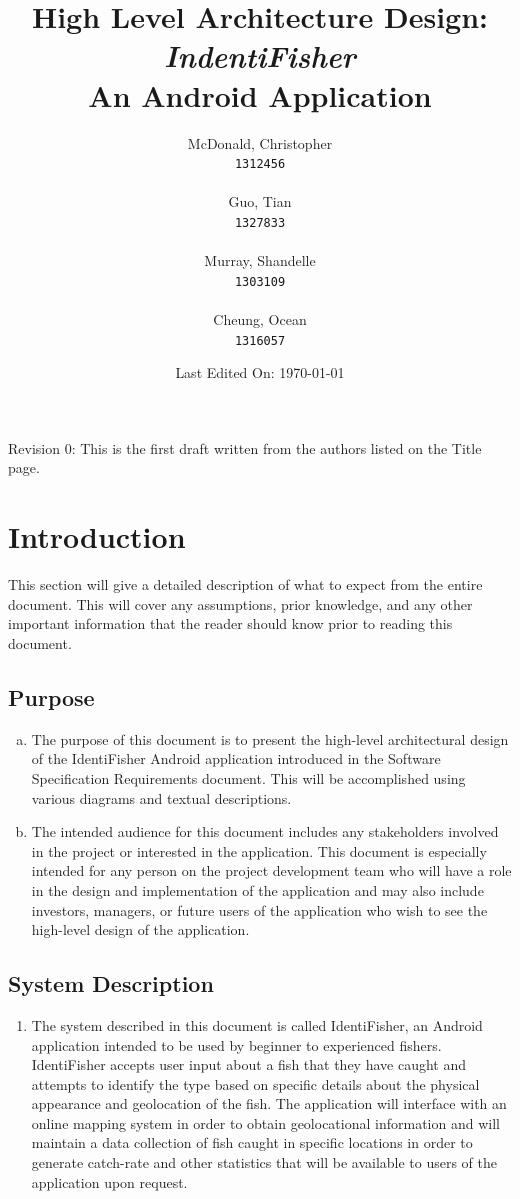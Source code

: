 \documentclass[]{article}
\title{High Level Architecture Design: \\ \textit{IndentiFisher} \\ An Android Application \\}
\author{
\Large McDonald, Christopher\\
\texttt{1312456} \\ \\
\Large Guo, Tian\\
\texttt{1327833} \\ \\
\Large Murray, Shandelle\\
\texttt{1303109} \\ \\
\Large Cheung, Ocean\\
\texttt{1316057} \\
}
\date{Last Edited On: \today}
\begin{document}
\maketitle

\newpage
\tableofcontents

\vfill
Revision 0: This is the first draft written from the authors listed on the Title page.
\pagebreak

\section{Introduction}
\label{sec:introduction}
This section will give a detailed description of what to expect from the entire document. This will cover any assumptions, prior knowledge, and any other important information that the reader should know prior to reading this document.

\subsection{Purpose}
\label{sub:purpose}
\begin{enumerate}[a)]
	\item
	The purpose of this document is to present the high-level architectural design of the IdentiFisher Android application introduced in the Software Specification Requirements document. This will be accomplished using various diagrams and textual descriptions.
	\item
	The intended audience for this document includes any stakeholders involved in the project or interested in the application. This document is especially intended for any person on the project development team who will have a role in the design and implementation of the application and may also include investors, managers, or future users of the application who wish to see the high-level design of the application.
\end{enumerate}

\subsection{System Description}
\label{sub:system_description}
\begin{enumerate}[]
	\item
	The system described in this document is called IdentiFisher, an Android application intended to be used by beginner to experienced fishers. IdentiFisher accepts user input about a fish that they have caught and attempts to identify the type based on specific details about the physical appearance and geolocation of the fish. The application will interface with an online mapping system in order to obtain geolocational information and will maintain a data collection of fish caught in specific locations in order to generate catch-rate and other statistics that will be available to users of the application upon request.
\end{enumerate}
\end{document}
